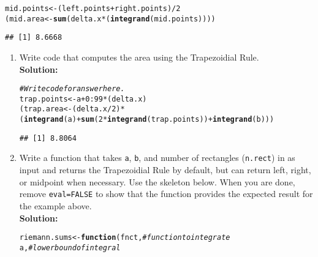 \documentclass{article}\usepackage[]{graphicx}\usepackage[]{xcolor}
\makeatletter
\newcommand{\hlnum}[1]{\textcolor[rgb]{0.686,0.059,0.569}{#1}}%
\newcommand{\hlcom}[1]{\textcolor[rgb]{0.678,0.584,0.686}{\textit{#1}}}%
\newcommand{\hlopt}[1]{\textcolor[rgb]{0,0,0}{#1}}%
\newcommand{\hldef}[1]{\textcolor[rgb]{0.345,0.345,0.345}{#1}}%
\newcommand{\hlkwa}[1]{\textcolor[rgb]{0.161,0.373,0.58}{\textbf{#1}}}%
\newcommand{\hlkwb}[1]{\textcolor[rgb]{0.69,0.353,0.396}{#1}}%
\newcommand{\hlkwc}[1]{\textcolor[rgb]{0.333,0.667,0.333}{#1}}%
\newcommand{\hlkwd}[1]{\textcolor[rgb]{0.737,0.353,0.396}{\textbf{#1}}}%
\newenvironment{kframe}{%
 \def\at@end@of@kframe{}%
 \ifinner\ifhmode%
  \def\at@end@of@kframe{\end{minipage}}%
  \begin{minipage}{\columnwidth}%
 \fi\fi%
 \def\FrameCommand##1{\hskip\@totalleftmargin \hskip-\fboxsep
 \colorbox{shadecolor}{##1}\hskip-\fboxsep
     \hskip-\linewidth \hskip-\@totalleftmargin \hskip\columnwidth}%
 \MakeFramed {\advance\hsize-\width
   \@totalleftmargin\z@ \linewidth\hsize
   \@setminipage}}%
 {\par\unskip\endMakeFramed%
 \at@end@of@kframe}
\newenvironment{knitrout}{}{} %
\makeatother
\begin{document}
\begin{enumerate}
\begin{knitrout}
\begin{kframe}
\begin{alltt}
\hldef{mid.points} \hlkwb{<-} \hldef{(left.points}\hlopt{+}\hldef{right.points)}\hlopt{/}\hlnum{2}
\hldef{(mid.area} \hlkwb{<-} \hlkwd{sum}\hldef{(delta.x}\hlopt{*}\hldef{(}\hlkwd{integrand}\hldef{(mid.points))))}
\end{alltt}
\begin{verbatim}
## [1] 8.6668
\end{verbatim}
\end{kframe}
\end{knitrout}
\newpage
\begin{enumerate}
  \item Write code that computes the area using the Trapezoidial Rule.\\
  \textbf{Solution:}
\begin{knitrout}\scriptsize
{}\color{fgcolor}\begin{kframe}
\begin{alltt}
\hlcom{# Write code for answer here.}
\hldef{trap.points} \hlkwb{<-}  \hldef{a} \hlopt{+} \hlnum{0}\hlopt{:}\hlnum{99}\hlopt{*}\hldef{(delta.x)}
\hldef{(trap.area} \hlkwb{<-} \hldef{(delta.x}\hlopt{/}\hlnum{2}\hldef{)}\hlopt{*}\hldef{(}\hlkwd{integrand}\hldef{(a)}\hlopt{+}\hlkwd{sum}\hldef{(}\hlnum{2}\hlopt{*}\hlkwd{integrand}\hldef{(trap.points))}\hlopt{+}\hlkwd{integrand}\hldef{(b)))}
\end{alltt}
\begin{verbatim}
## [1] 8.8064
\end{verbatim}
\end{kframe}
\end{knitrout}
  \item Write a function that takes \texttt{a}, \texttt{b}, and number of 
  rectangles (\texttt{n.rect}) in as input and returns the Trapezoidial Rule 
  by default, but can return left, right, or midpoint when necessary. Use the
  skeleton below. When you are done, remove \texttt{eval=FALSE} to show that
  the function provides the expected result for the example above.\\
  \textbf{Solution:}
\begin{knitrout}\scriptsize
{}\color{fgcolor}\begin{kframe}
\begin{alltt}
\hldef{riemann.sums} \hlkwb{<-} \hlkwa{function}\hldef{(}\hlkwc{fnct}\hldef{,}                        \hlcom{# function to integrate}
                         \hlkwc{a}\hldef{,}                           \hlcom{# lower bound of integral}

\end{alltt}
\end{kframe}
\end{knitrout}
\end{enumerate}
\end{enumerate}
\end{document}
